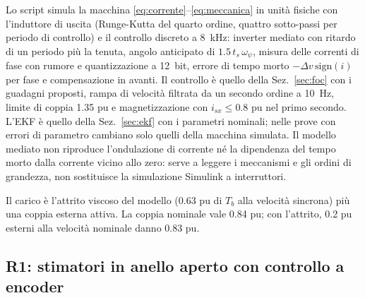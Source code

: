 \documentclass[10pt,a4paper]{scrartcl}
\newcommand{\ts}{t_s}
\begin{document}
\begin{onehalfspace}
Lo script simula la macchina \eqref{eq:corrente}--\eqref{eq:meccanica} in unità fisiche con l'induttore di uscita (Runge-Kutta del quarto ordine, quattro sotto-passi per periodo di controllo) e il controllo discreto a \SI{8}{kHz}: inverter mediato con ritardo di un periodo più la tenuta, angolo anticipato di $1.5\,\ts\,\omega_\psi$, misura delle correnti di fase con rumore e quantizzazione a \SI{12}{bit}, errore di tempo morto $-\Delta v\,\mathrm{sign}(i)$ per fase e compensazione in avanti. Il controllo è quello della Sez.~\ref{sec:foc} con i guadagni proposti, rampa di velocità filtrata da un secondo ordine a \SI{10}{Hz}, limite di coppia \num{1.35} pu e magnetizzazione con $i_{sx} \le \num{0.8}$ pu nel primo secondo. L'EKF è quello della Sez.~\ref{sec:ekf} con i parametri nominali; nelle prove con errori di parametro cambiano solo quelli della macchina simulata. Il modello mediato non riproduce l'ondulazione di corrente né la dipendenza del tempo morto dalla corrente vicino allo zero: serve a leggere i meccanismi e gli ordini di grandezza, non sostituisce la simulazione Simulink a interruttori.

Il carico è l'attrito viscoso del modello (\num{0.63} pu di $T_b$ alla velocità sincrona) più una coppia esterna attiva. La coppia nominale vale \num{0.84} pu; con l'attrito, \num{0.2} pu esterni alla velocità nominale danno \num{0.83} pu.

\subsection{R1: stimatori in anello aperto con controllo a encoder}
\label{sec:r1}


\end{onehalfspace}
\end{document}
